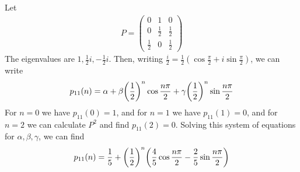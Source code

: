 \begin{example}
	Let
	\begin{align*}
		P = \begin{pmatrix}
			0           & 1           & 0           \\
			0           & \frac{1}{2} & \frac{1}{2} \\
			\frac{1}{2} & 0           & \frac{1}{2}
		\end{pmatrix}
	\end{align*}
	The eigenvalues are $1, \frac{1}{2}i, -\frac{1}{2}i$.
	Then, writing $\frac{i}{2} = \frac{1}{2} (\cos \frac{\pi}{2} + i \sin \frac{\pi}{2} )$, we can write
	\begin{align*}
		p_{11}(n) = \alpha + \beta \qty(\frac{1}{2})^n \cos \frac{n \pi}{2} + \gamma \qty(\frac{1}{2})^n \sin \frac{n \pi}{2}
	\end{align*}
	For $n = 0$ we have $p_{11}(0) = 1$, and for $n = 1$ we have $p_{11}(1) = 0$, and for $n = 2$ we can calculate $P^2$ and find $p_{11}(2) = 0$.
	Solving this system of equations for $\alpha, \beta, \gamma$, we can find
	\begin{align*}
		p_{11}(n) = \frac{1}{5} + \qty(\frac{1}{2})^n \qty(\frac{4}{5}\cos \frac{n \pi}{2} - \frac{2}{5}\sin \frac{n \pi}{2} )
	\end{align*}
\end{example}
